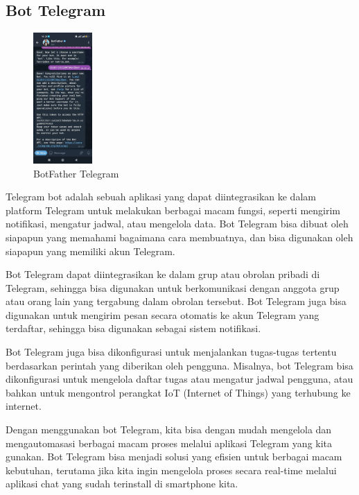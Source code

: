 \documentclass[conference]{IEEEtran}
\begin{document}
\subsection{Bot Telegram}
\vspace{0.2cm}
\begin{figure}[h]
    \centering
    \includegraphics[width=0.2\textwidth]{botfather.jpeg}
    \caption{BotFather Telegram}
\end{figure}

Telegram bot adalah sebuah aplikasi yang dapat diintegrasikan ke dalam platform Telegram untuk melakukan berbagai macam fungsi, seperti mengirim notifikasi, mengatur jadwal, atau mengelola data. Bot Telegram bisa dibuat oleh siapapun yang memahami bagaimana cara membuatnya, dan bisa digunakan oleh siapapun yang memiliki akun Telegram.

Bot Telegram dapat diintegrasikan ke dalam grup atau obrolan pribadi di Telegram, sehingga bisa digunakan untuk berkomunikasi dengan anggota grup atau orang lain yang tergabung dalam obrolan tersebut. Bot Telegram juga bisa digunakan untuk mengirim pesan secara otomatis ke akun Telegram yang terdaftar, sehingga bisa digunakan sebagai sistem notifikasi.

Bot Telegram juga bisa dikonfigurasi untuk menjalankan tugas-tugas tertentu berdasarkan perintah yang diberikan oleh pengguna. Misalnya, bot Telegram bisa dikonfigurasi untuk mengelola daftar tugas atau mengatur jadwal pengguna, atau bahkan untuk mengontrol perangkat IoT (Internet of Things) yang terhubung ke internet.

Dengan menggunakan bot Telegram, kita bisa dengan mudah mengelola dan mengautomasasi berbagai macam proses melalui aplikasi Telegram yang kita gunakan. Bot Telegram bisa menjadi solusi yang efisien untuk berbagai macam kebutuhan, terutama jika kita ingin mengelola proses secara real-time melalui aplikasi chat yang sudah terinstall di smartphone kita.
\end{document}

